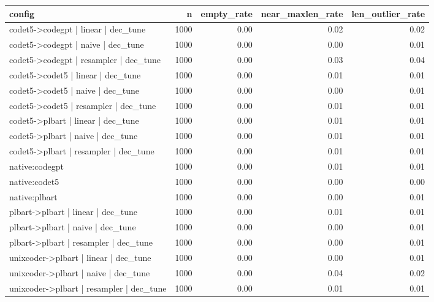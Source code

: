 \begin{tabular}{lrrrr}
\toprule
config & n & empty_rate & near_maxlen_rate & len_outlier_rate \\
\midrule
codet5->codegpt | linear | dec_tune & 1000 & 0.00 & 0.02 & 0.02 \\
codet5->codegpt | naive | dec_tune & 1000 & 0.00 & 0.00 & 0.01 \\
codet5->codegpt | resampler | dec_tune & 1000 & 0.00 & 0.03 & 0.04 \\
codet5->codet5 | linear | dec_tune & 1000 & 0.00 & 0.01 & 0.01 \\
codet5->codet5 | naive | dec_tune & 1000 & 0.00 & 0.00 & 0.01 \\
codet5->codet5 | resampler | dec_tune & 1000 & 0.00 & 0.01 & 0.01 \\
codet5->plbart | linear | dec_tune & 1000 & 0.00 & 0.01 & 0.01 \\
codet5->plbart | naive | dec_tune & 1000 & 0.00 & 0.01 & 0.01 \\
codet5->plbart | resampler | dec_tune & 1000 & 0.00 & 0.01 & 0.01 \\
native:codegpt & 1000 & 0.00 & 0.01 & 0.01 \\
native:codet5 & 1000 & 0.00 & 0.00 & 0.00 \\
native:plbart & 1000 & 0.00 & 0.00 & 0.01 \\
plbart->plbart | linear | dec_tune & 1000 & 0.00 & 0.01 & 0.01 \\
plbart->plbart | naive | dec_tune & 1000 & 0.00 & 0.00 & 0.01 \\
plbart->plbart | resampler | dec_tune & 1000 & 0.00 & 0.00 & 0.01 \\
unixcoder->plbart | linear | dec_tune & 1000 & 0.00 & 0.00 & 0.01 \\
unixcoder->plbart | naive | dec_tune & 1000 & 0.00 & 0.04 & 0.02 \\
unixcoder->plbart | resampler | dec_tune & 1000 & 0.00 & 0.01 & 0.01 \\
\bottomrule
\end{tabular}
